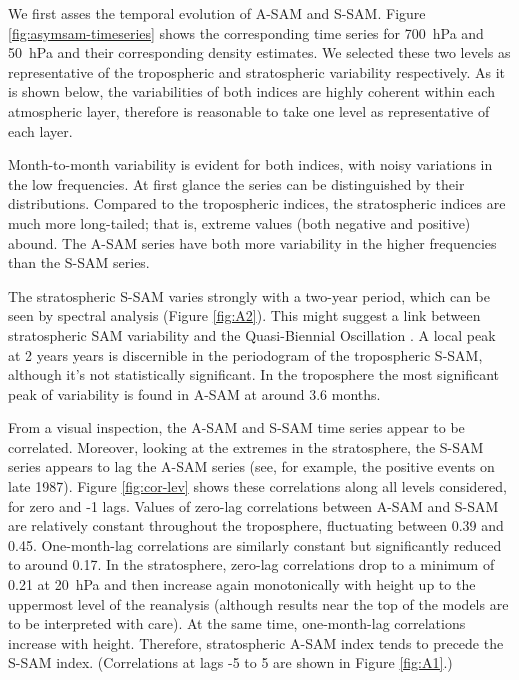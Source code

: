\documentclass[smallextended]{svjour3}       %
\begin{document}
We first asses the temporal evolution of A\nobreakdash-SAM and S\nobreakdash-SAM. Figure \ref{fig:asymsam-timeseries} shows the corresponding time series for 700~hPa and 50~hPa and their corresponding density estimates. We selected these two levels as representative of the tropospheric and stratospheric variability respectively. As it is shown below, the variabilities of both indices are highly coherent within each atmospheric layer, therefore is reasonable to take one level as representative of each layer.

Month-to-month variability is evident for both indices, with noisy variations in the low frequencies. At first glance the series can be distinguished by their distributions. Compared to the tropospheric indices, the stratospheric indices are much more long-tailed; that is, extreme values (both negative and positive) abound. The A\nobreakdash-SAM series have both more variability in the higher frequencies than the S\nobreakdash-SAM series.

The stratospheric S\nobreakdash-SAM varies strongly with a two-year period, which can be seen by spectral analysis (Figure \ref{fig:A2}). This might suggest a link between stratospheric SAM variability and the Quasi-Biennial Oscillation \citep{baldwin2001b}. A local peak at 2 years years is discernible in the periodogram of the tropospheric S\nobreakdash-SAM, although it's not statistically significant. In the troposphere the most significant peak of variability is found in A\nobreakdash-SAM at around 3.6 months.

From a visual inspection, the A\nobreakdash-SAM and S\nobreakdash-SAM time series appear to be correlated. Moreover, looking at the extremes in the stratosphere, the S\nobreakdash-SAM series appears to lag the A\nobreakdash-SAM series (see, for example, the positive events on late 1987). Figure \ref{fig:cor-lev} shows these correlations along all levels considered, for zero and -1 lags. Values of zero-lag correlations between A\nobreakdash-SAM and S\nobreakdash-SAM are relatively constant throughout the troposphere, fluctuating between 0.39 and 0.45. One-month-lag correlations are similarly constant but significantly reduced to around 0.17. In the stratosphere, zero-lag correlations drop to a minimum of 0.21 at 20~hPa and then increase again monotonically with height up to the uppermost level of the reanalysis (although results near the top of the models are to be interpreted with care). At the same time, one-month-lag correlations increase with height. Therefore, stratospheric A\nobreakdash-SAM index tends to precede the S\nobreakdash-SAM index. (Correlations at lags -5 to 5 are shown in Figure \ref{fig:A1}.)
\end{document}
